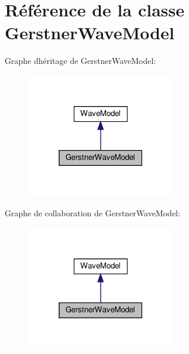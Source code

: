 \hypertarget{class_gerstner_wave_model}{}\section{Référence de la classe Gerstner\+Wave\+Model}
\label{class_gerstner_wave_model}


Graphe d\textquotesingle{}héritage de Gerstner\+Wave\+Model\+:
\nopagebreak
\begin{figure}[H]
\begin{center}
\leavevmode
\includegraphics[width=186pt]{class_gerstner_wave_model__inherit__graph}
\end{center}
\end{figure}


Graphe de collaboration de Gerstner\+Wave\+Model\+:
\nopagebreak
\begin{figure}[H]
\begin{center}
\leavevmode
\includegraphics[width=186pt]{class_gerstner_wave_model__coll__graph}
\end{center}
\end{figure}
